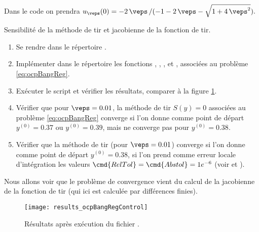     \begin{myremark}
        Dans le code on prendra
        $
            u_\veps(0) = {-2\, \veps\,}/{(-1-2\,\veps-\sqrt{1+4\,\veps^2})}.
        $
    \end{myremark}

    \begin{myExercice} Sensibilit\'e de la m\'ethode de tir et jacobienne de la fonction de tir.
        \begin{enumerate}
            \item Se rendre dans le r\'epertoire .
            \item Impl\'ementer dans le r\'epertoire  les fonctions , , ,  et ,
                associ\'ees au probl\`eme \eqref{eq:ocpBangReg}.
            \item Ex\'ecuter le script  et v\'erifier les r\'esultats, \ie comparer \`a la figure \ref{fig:results_ocpBangRegControl}.
            \item V\'erifier que pour $\veps=0.01$, la m\'ethode de tir $S(y)=0$ associ\'ees au probl\`eme \eqref{eq:ocpBangReg} converge
                si l'on donne comme point de d\'epart $y^{(0)}=0.37$ ou $y^{(0)}=0.39$, mais ne converge pas pour $y^{(0)}=0.38$.
            \item V\'erifier que la m\'ethode de tir (pour $\veps=0.01$) converge si l'on donne comme point de d\'epart $y^{(0)}=0.38$, si l'on
                prend comme erreur locale d'int\'egration les valeurs $\cmd{RelTol} = \cmd{Abstol} = 1e^{-6}$ (voir 
                et ).
        \end{enumerate}
        \anoter Nous allons voir que le probl\`eme de convergence vient du calcul de la jacobienne de la fonction de tir (qui ici est calcul\'ee par
        diff\'erences finies).
    \end{myExercice}

    \begin{figure}[ht!]
        \begin{center}
            \texttt{[image: results\_ocpBangRegControl]}
        \end{center}
        \caption{R\'esultats apr\`es ex\'ecution du fichier .}
        \label{fig:results_ocpBangRegControl}
    \end{figure}

